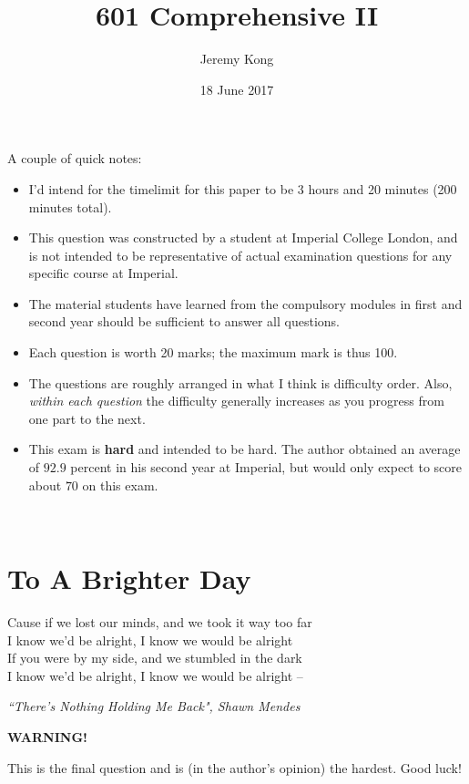 \documentclass[12pt, a4paper]{article}
\title{601 Comprehensive II}
\author{Jeremy Kong}
\date{18 June 2017}
\begin{document}
\maketitle

\noindent A couple of quick notes:
\begin{itemize}
\item I'd intend for the timelimit for this paper to be 3 hours and 20 minutes (200 minutes total).
\item This question was constructed by a student at Imperial College London, and is not intended to be representative of actual examination questions for any specific course at Imperial.
\item The material students have learned from the compulsory modules in first and second year should be sufficient to answer all questions.
\item Each question is worth 20 marks; the maximum mark is thus 100.
\item The questions are roughly arranged in what I think is difficulty order. Also, \textit{within each question} the difficulty generally increases as you progress from one part to the next.
\item This exam is \textbf{hard} and intended to be hard. The author obtained an average of $92.9$ percent in his second year at Imperial, but would only expect to score about $70$ on this exam.
\end{itemize}

\newpage
$\:$
\newpage 

\section{To A Brighter Day}
\epigraph{Cause if we lost our minds, and we took it way too far \\
I know we'd be alright, I know we would be alright \\
If you were by my side, and we stumbled in the dark \\
I know we'd be alright, I know we would be alright --
}{\textit{``There's Nothing Holding Me Back", Shawn Mendes}}
\begin{center}
\textbf{WARNING!}

This is the final question and is (in the author's opinion) the hardest. Good luck!
\end{center}
\end{document}
